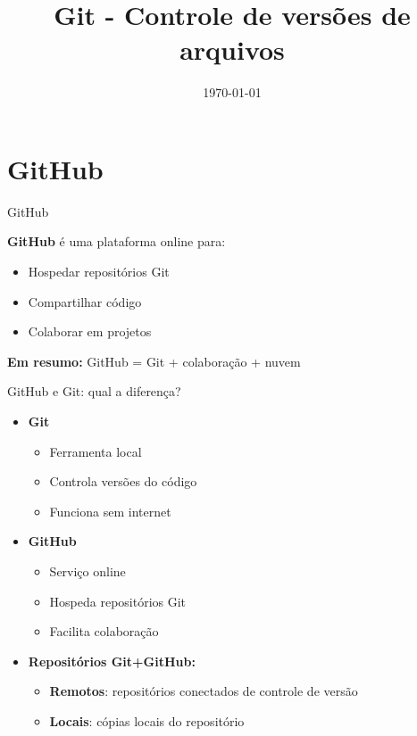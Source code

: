 \documentclass{beamer}
\title{Git - Controle de versões de arquivos}
\date{\today}
\begin{document}
    

\sumario

\section{GitHub}

\begin{frame}{GitHub}
    
    \textbf{GitHub} é uma plataforma online para:
    \begin{itemize}
        \item Hospedar repositórios Git
        \item Compartilhar código
        \item Colaborar em projetos
    \end{itemize}
    
    \vspace{0.3cm}
    
    \textbf{Em resumo:}  
    GitHub = Git + colaboração + nuvem
    
\end{frame}

\begin{frame}{GitHub e Git: qual a diferença?}
    
    \begin{itemize}
        \item \textbf{Git}
        \begin{itemize}
            \item Ferramenta local
            \item Controla versões do código
            \item Funciona sem internet
        \end{itemize}
        
        \vspace{0.3cm}
        
        \item \textbf{GitHub}
        \begin{itemize}
            \item Serviço online
            \item Hospeda repositórios Git
            \item Facilita colaboração
        \end{itemize}
    
        \vspace{0.3cm}
        \item \textbf{Repositórios Git+GitHub:}
        \begin{itemize}
            \item \textbf{Remotos}: repositórios conectados de controle de versão
            \item \textbf{Locais}: cópias locais do repositório
        \end{itemize}
    \end{itemize}
\end{frame}
\end{document}
